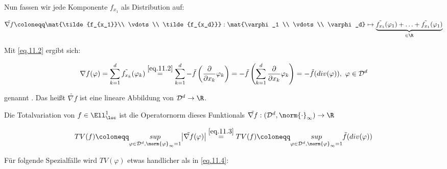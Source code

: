 Nun fassen wir jede Komponente $f_{x_1}$ als Distribution auf:

\[\tilde{\nabla f} \coloneqq \mat{\tilde{f_{x_1}}\\ \vdots \\ \tilde{f_{x_d}}}: \mat{\varphi_1 \\ \vdots \\ \varphi_d} \mapsto \underbrace{\tilde{f_{x_1}}(\varphi_1) + \hdots + \tilde{f_{x_1}}(\varphi_1)}_{\in \R}\]

Mit \eqref{eq.11.2} ergibt sich:

\begin{equation}\label{eq.11.3}
    \nabla f(\varphi)=\sum_{k=1}^d \tilde{f_{x_k}}(\varphi_k) \overset{\eqref{eq.11.2}}{=} \sum_{k=1}^d - \tilde{f}\left(\frac{\partial}{\partial x_k} \varphi_k \right) = -\tilde{f} \left( \sum_{k=1}^d \frac{\partial}{\partial x_k} \varphi_k \right) = - \tilde f (div(\varphi)), \ \varphi \in \mathcal{D}^d
\end{equation}

genannt . Das heißt $\tilde{\nabla f}$ ist eine lineare Abbildung von $\D^d \to \R$.

Die Totalvariation von $f \in \Ell^1_{\loc}$ ist die Operatornorm dieses Funktionals $\tilde{\nabla f}:(\D^d,\norm{\cdot}_\infty) \to \R$

\begin{equation}\label{eq.11.4}
    TV(f) \coloneqq \underset{\varphi \in \D^d, \norm{\varphi}_\infty = 1}{sup} \bigl| \tilde{\nabla f}(\varphi)\bigr| \overset{\eqref{eq.11.3}}{=} TV(f) \coloneqq \underset{\varphi \in \D^d, \norm{\varphi}_\infty = 1}{sup} \tilde{f}(div(\varphi))
\end{equation}

Für folgende Spezialfälle wird  $TV(\varphi)$ etwas handlicher als in \eqref{eq.11.4}:

